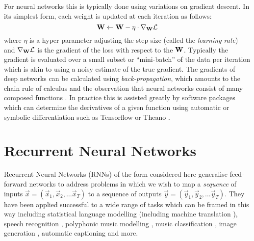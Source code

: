 For neural networks this is typically done using variations on gradient descent. In its simplest
form, each weight is updated at each iteration as follows:
\begin{equation} \label{eq:graddescent}
	\mathbf{W} \gets \mathbf{W} - \eta \cdot \nabla_{\mathbf{W}}\mathcal{L}
\end{equation} where \(\eta\) is a hyper parameter adjusting the step size (called the
\emph{learning rate}) and \(\nabla_{\mathbf{W}}\mathcal{L}\) is the gradient of the loss with respect
to the \(\mathbf{W}\). Typically the gradient is evaluated over a small subset or ``mini-batch''
 of the data per iteration which is akin to using a noisy estimate of the true gradient.
The gradients of deep networks can be calculated using \emph{back-propagation}, which amounts
to the chain rule of calculus and the observation that neural networks consist of many
composed functions \autocite{Rumelhart1986}. In practice this is assisted greatly by software
packages which can determine the derivatives of a given function using automatic or symbolic
differentiation such as Tensorflow \autocite{Abadi2015} or Theano
 \autocite{TheTheanoDevelopmentTeam2016}.



\section{Recurrent Neural Networks}
Recurrent Neural Networks (RNNs) of the form considered here generalise feed-forward networks to
address problems in which we wish to map a \emph{sequence} of inputs 
\(\vec{x} = (\vec{x}_1, \vec{x}_2, \dots \vec{x}_T) \) to a sequence of outputs
\(\vec{y} = (\vec{y}_1, \vec{y}_2, \dots \vec{y}_T) \). They have been applied successful to a
wide range of tasks which can be framed in this way including statistical language modelling
\autocite{Mikolov2012} (including machine translation \autocite{Cho2014, Wu2016a}), speech 
recognition \autocite{Graves2006}, polyphonic music 
modelling \autocite{Boulanger-Lewandowski2012}, music classification \autocite{Choi2016},
image generation \autocite{Gregor2015}, automatic captioning \autocite{Vinyals2016, Xu2015}  and more.

